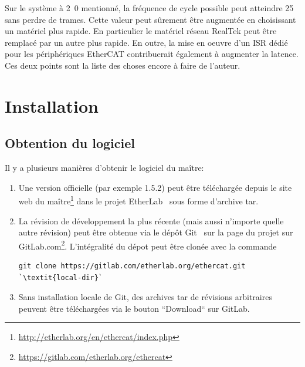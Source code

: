 \documentclass[a4paper,12pt,BCOR=6mm,bibtotoc,idxtotoc]{scrbook}
\newcommand{\masterversion}{1.5.2}
\begin{document}
Sur le syst\`eme \`a \unit{2.0}{\giga\hertz} mentionn\'e, la
fr\'equence de cycle possible peut atteindre \unit{25}{\kilo\hertz}
sans perdre de trames.  Cette valeur peut s\^urement \^etre
augment\'ee en choisissant un mat\'eriel plus rapide.  En particulier
le mat\'eriel r\'eseau RealTek peut \^etre remplac\'e par un autre
plus rapide.  En outre, la mise en oeuvre d'un ISR d\'edi\'e pour les
p\'eriph\'eriques EtherCAT contribuerait \'egalement \`a augmenter la
latence. Ces deux points sont la liste des choses encore \`a faire de
l'auteur.


\chapter{Installation}
\label{sec:installation}

\section{Obtention du logiciel}
\label{sec:getting}

Il y a plusieurs mani\`eres d'obtenir le logiciel du ma\^itre:

\begin{enumerate}

\item Une version officielle (par exemple \masterversion) peut \^etre
  t\'el\'echarg\'ee depuis le site web du
  ma\^itre\footnote{\url{http://etherlab.org/en/ethercat/index.php}}
  dans le projet EtherLab~\cite{etherlab} sous forme d'archive tar.

\item La r\'evision de d\'eveloppement la plus r\'ecente (mais aussi
  n'importe quelle autre r\'evision) peut \^etre obtenue via le
  d\'ep\^ot Git~\cite{git} sur la page du projet sur
  GitLab.com\footnote{\url{https://gitlab.com/etherlab.org/ethercat}}.
  L'int\'egralit\'e du d\'epot peut \^etre clon\'ee avec la commande

\begin{lstlisting}[breaklines=true]
 git clone https://gitlab.com/etherlab.org/ethercat.git `\textit{local-dir}`
\end{lstlisting}

\item Sans installation locale de Git, des archives tar de
  r\'evisions arbitraires peuvent \^etre t\'el\'echarg\'ees via le
  bouton ``Download`` sur GitLab.

\end{enumerate}
\end{document}
